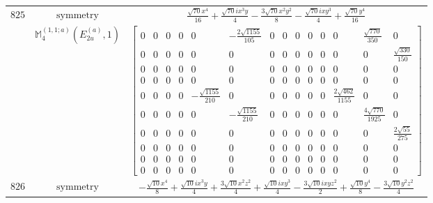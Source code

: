 \documentclass[fleqn,8pt,landscape]{jsarticle}
\begin{document}
\begin{longtable}{ccc}
$ 825 $ & $ \text{symmetry} $ & $ \frac{\sqrt{70} x^{4}}{16} + \frac{\sqrt{70} i x^{3} y}{4} - \frac{3 \sqrt{70} x^{2} y^{2}}{8} - \frac{\sqrt{70} i x y^{3}}{4} + \frac{\sqrt{70} y^{4}}{16} $ \\
$  $ & $ \mathbb{M}_{4}^{(1,1;a)}(E_{2u}^{(a)},1) $ & $ \begin{bmatrix} 0 & 0 & 0 & 0 & 0 & - \frac{2 \sqrt{1155}}{105} & 0 & 0 & 0 & 0 & 0 & 0 & \frac{\sqrt{770}}{350} & 0 \\ 0 & 0 & 0 & 0 & 0 & 0 & 0 & 0 & 0 & 0 & 0 & 0 & 0 & \frac{\sqrt{330}}{150} \\ 0 & 0 & 0 & 0 & 0 & 0 & 0 & 0 & 0 & 0 & 0 & 0 & 0 & 0 \\ 0 & 0 & 0 & 0 & 0 & 0 & 0 & 0 & 0 & 0 & 0 & 0 & 0 & 0 \\ 0 & 0 & 0 & 0 & - \frac{\sqrt{1155}}{210} & 0 & 0 & 0 & 0 & 0 & 0 & \frac{2 \sqrt{462}}{1155} & 0 & 0 \\ 0 & 0 & 0 & 0 & 0 & - \frac{\sqrt{1155}}{210} & 0 & 0 & 0 & 0 & 0 & 0 & \frac{4 \sqrt{770}}{1925} & 0 \\ 0 & 0 & 0 & 0 & 0 & 0 & 0 & 0 & 0 & 0 & 0 & 0 & 0 & \frac{2 \sqrt{55}}{275} \\ 0 & 0 & 0 & 0 & 0 & 0 & 0 & 0 & 0 & 0 & 0 & 0 & 0 & 0 \\ 0 & 0 & 0 & 0 & 0 & 0 & 0 & 0 & 0 & 0 & 0 & 0 & 0 & 0 \\ 0 & 0 & 0 & 0 & 0 & 0 & 0 & 0 & 0 & 0 & 0 & 0 & 0 & 0 \end{bmatrix} $ \\ \hline
$ 826 $ & $ \text{symmetry} $ & $ - \frac{\sqrt{10} x^{4}}{8} + \frac{\sqrt{10} i x^{3} y}{4} + \frac{3 \sqrt{10} x^{2} z^{2}}{4} + \frac{\sqrt{10} i x y^{3}}{4} - \frac{3 \sqrt{10} i x y z^{2}}{2} + \frac{\sqrt{10} y^{4}}{8} - \frac{3 \sqrt{10} y^{2} z^{2}}{4} $ \\

\end{longtable}
\end{document}
